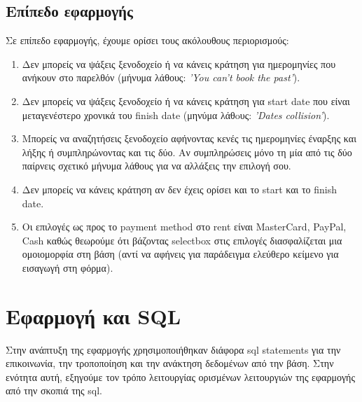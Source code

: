 \documentclass[a4paper,oneside, 11pt]{article}
\begin{document}
\subsection{Επίπεδο εφαρμογής}
Σε επίπεδο εφαρμογής, έχουμε ορίσει τους ακόλουθους περιορισμούς:
\begin{enumerate}
\item Δεν μπορείς να ψάξεις ξενοδοχείο ή να κάνεις κράτηση για ημερομηνίες που ανήκουν στο παρελθόν (μήνυμα λάθους: \textit{'You can't book the past'}). 
\item Δεν μπορείς να ψάξεις ξενοδοχείο ή να κάνεις κράτηση για start date που είναι μεταγενέστερο χρονικά του finish date (μηνύμα λάθoυς: \textit{'Dates collision'}). 
\item Μπορείς να αναζητήσεις ξενοδοχείο αφήνοντας κενές τις ημερομηνίες έναρξης και λήξης ή συμπληρώνοντας και τις δύο. Αν συμπληρώσεις μόνο τη μία από τις δύο παίρνεις σχετικό μήνυμα λάθους για να αλλάξεις την επιλογή σου.
\item Δεν μπορείς να κάνεις κράτηση αν δεν έχεις ορίσει και το start και το finish date.
\item Οι επιλογές ως προς το payment method στο rent είναι MasterCard, PayPal, Cash καθώς θεωρούμε ότι βάζοντας selectbox στις επιλογές διασφαλίζεται μια ομοιομορφία στη βάση (αντί να αφήνεις για παράδειγμα ελεύθερο κείμενο για εισαγωγή στη φόρμα).
\end{enumerate}





\section{Εφαρμογή και SQL}
Στην ανάπτυξη της εφαρμογής χρησιμοποιήθηκαν διάφορα sql statements για την επικοινωνία, την τροποποίηση και την ανάκτηση δεδομένων από την βάση. Στην ενότητα αυτή, εξηγούμε τον τρόπο λειτουργίας ορισμένων λειτουργιών της εφαρμογής από την σκοπιά της sql.
\end{document}
